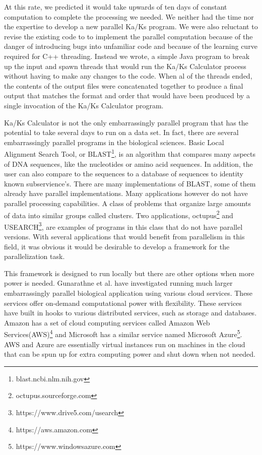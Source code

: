 \documentclass[12pt]{article}
\begin{document}
At this rate, we predicted it would take upwards of ten days of constant
computation to complete the processing we needed. We neither had the time nor
the expertise to develop a new parallel Ka/Ks program. We were also reluctant to
revise the existing code to to implement the parallel computation because of the
danger of introducing bugs into unfamiliar code and because of the learning
curve required for C++ threading. Instead we wrote, a simple Java program to
break up the input and spawn threads that would run the Ka/Ks Calculator process
without having to make any changes to the code. When al of the threads ended,
the contents of the output files were concatenated together to produce a final
output that matches the format and order that would have been produced by a
single invocation of the Ka/Ks Calculator program.

Ka/Ks Calculator is not the only embarrassingly parallel program that has the
potential to take several days to run on a data set. In fact, there are several
embarrassingly parallel programs in the biological sciences. Basic Local
Alignment Search Tool, or BLAST\footnote{blast.ncbi.nlm.nih.gov}, is an
algorithm that compares many aspects of DNA sequences, like the nucleotides or
amino acid sequences. In addition, the user can also compare to the sequences to
a database of sequences to identity known subservience's. There are many
implementations of BLAST, some of them already have parallel implementations.
Many applications however do not have parallel processing capabilities. A class
of problems that organize large amounts of data into similar groups called
clusters. Two applications, octupus\footnote{octupus.sourceforge.com} and
USEARCH\footnote{https://www.drive5.com/usearch}, are examples of programs in
this class that do not have parallel versions. With several applications that
would benefit from parallelism in this field, it was obvious it would be
desirable to develop a framework for the parallelization task.

This framework is designed to run locally but there are other options when more
power is needed. Gunarathne et al.\cite{cloud} have investigated running much
larger embarrassingly parallel biological application using various cloud
services. These services offer on-demand computational power with flexibility.
These services have built in hooks to various distributed services, such as
storage and databases. Amazon has a set of cloud computing services called
Amazon Web Services(AWS)\footnote{https://aws.amazon.com} and Microsoft has a
similar service named Microsoft Azure\footnote{https://www.windowsazure.com}.
AWS and Azure are essentially virtual instances run on machines in the cloud
that can be spun up for extra computing power and shut down when not needed. 
\end{document}
